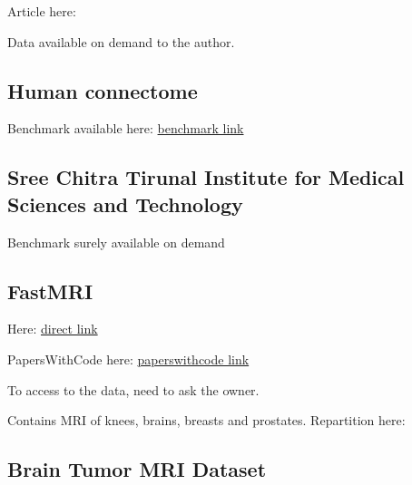 Article here: 

Data available on demand to the author.

\subsection{Human connectome}

Benchmark available here: \href{https://www.humanconnectome.org/study/hcp-young-adult}{benchmark link}

\subsection{Sree Chitra Tirunal Institute for Medical Sciences and Technology}

Benchmark surely available on demand


\subsection{FastMRI}
\label{dt:FastMRI}

Here: \href{https://fastmri.med.nyu.edu/}{direct link}

PapersWithCode here: \href{https://paperswithcode.com/dataset/fastmri}{paperswithcode link}

To access to the data, need to ask the owner.

Contains MRI of knees, brains, breasts and prostates. Repartition here: 

\begin{table}[htbp]
	\centering
	\caption{Repartition in the benchmark of FastMRI ()}
	\label{tab:FastMRI}
\end{table}

\subsection{Brain Tumor MRI Dataset}

